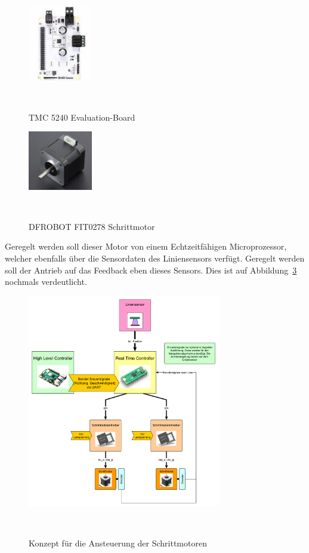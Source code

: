 \documentclass[main.tex]{subfiles} %
\begin{document}
\begin{figure}[h!]
    \centering
    \includegraphics[width=0.25\textwidth]{./fig_Antriebe/TMC_5240_EVAL.png}
    \caption{TMC 5240 Evaluation-Board}~\label{fig:TMC5240_EVAL}
\end{figure}

\begin{figure}[h!]
    \centering
    \includegraphics[width=0.25\textwidth]{./fig_Antriebe/DFRobot_Stepper_FIT0278.png}
    \caption{DFROBOT FIT0278 Schrittmotor}~\label{fig:DFROBOT_FIT0278}
\end{figure}

Geregelt werden soll dieser Motor von einem Echtzeitfähigen Microprozessor,
welcher ebenfalls über die Sensordaten des Liniensensors verfügt. Geregelt
werden soll der Antrieb auf das Feedback eben dieses Sensors. Dies ist auf
Abbildung~\ref{fig:RTC_Trinamic_Konzept} nochmals verdeutlicht.

\begin{figure}[h!]
    \centering
    \includegraphics[width=0.75\textwidth]{./fig_Antriebe/Konzept_RTC_Trinamic.pdf}
    \caption{Konzept für die Ansteuerung der Schrittmotoren}~\label{fig:RTC_Trinamic_Konzept}
\end{figure}
\end{document}

